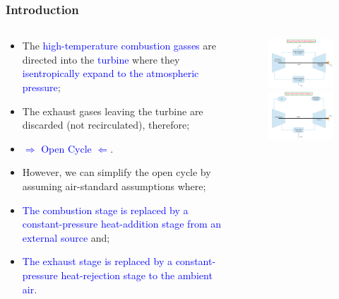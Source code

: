 \documentclass[10pt,compress]{beamer}
\begin{document}
\begin{frame}
 \frametitle{Introduction}
 \begin{columns}
  \begin{column}[c]{0.6\linewidth} 
   \begin{itemize}
    \item <1-> The \textcolor{blue}{high-temperature combustion gasses} are directed into the \textcolor{blue}{turbine} where they \textcolor{blue}{isentropically expand to the atmospheric pressure};
    \item <2-> The exhaust gases leaving the turbine are discarded (not recirculated), therefore; 
    \item <3-> \textcolor{blue}{$\Longrightarrow$ Open Cycle $\Longleftarrow$}.
    \item <4-> However, we can simplify the open cycle by assuming air-standard assumptions where;
    \item <5-> \textcolor{blue}{The combustion stage is replaced by a constant-pressure heat-addition stage from an external source} and;
    \item <6-> \textcolor{blue}{The exhaust stage is replaced by a constant-pressure heat-rejection stage to the ambient air}.
   \end{itemize}
  \end{column}
  \begin{column}[c]{0.4\linewidth}
   \begin{figure}%
    \vbox{
     \hbox{\includegraphics[width=5cm,clip]{./Pics/Closed_Gas_Turbine_Engines}}
     \hbox{\includegraphics[width=5cm,clip]{./Pics/Open_Gas_Turbine_Engines}}
     }
   \end{figure}  
  \end{column}  
 \end{columns}
\end{frame}
\end{document}

